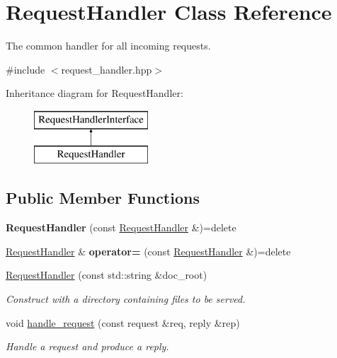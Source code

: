 \hypertarget{class_request_handler}{}\section{Request\+Handler Class Reference}
\label{class_request_handler}


The common handler for all incoming requests.  




{\ttfamily \#include $<$request\+\_\+handler.\+hpp$>$}

Inheritance diagram for Request\+Handler\+:\begin{figure}[H]
\begin{center}
\leavevmode
\includegraphics[height=2.000000cm]{class_request_handler}
\end{center}
\end{figure}
\subsection*{Public Member Functions}
\begin{DoxyCompactItemize}
\item 
\mbox{\label{class_request_handler_a7dc4f72ed63d826b58e8d5702a552287}} 
{\bfseries Request\+Handler} (const \hyperlink{class_request_handler}{Request\+Handler} \&)=delete
\item 
\mbox{\label{class_request_handler_a72a2ff62932e8ac74a5fe55415eff602}} 
\hyperlink{class_request_handler}{Request\+Handler} \& {\bfseries operator=} (const \hyperlink{class_request_handler}{Request\+Handler} \&)=delete
\item 
\mbox{\label{class_request_handler_ad8326a61b01339812eb11f2905f2407c}} 
\hyperlink{class_request_handler_ad8326a61b01339812eb11f2905f2407c}{Request\+Handler} (const std\+::string \&doc\+\_\+root)
\begin{DoxyCompactList}\small\item\em Construct with a directory containing files to be served. \end{DoxyCompactList}\item 
\mbox{\label{class_request_handler_ae7870b58bbff92ebab452e715a1f0121}} 
void \hyperlink{class_request_handler_ae7870b58bbff92ebab452e715a1f0121}{handle\+\_\+request} (const request \&req, reply \&rep)
\begin{DoxyCompactList}\small\item\em Handle a request and produce a reply. \end{DoxyCompactList}\end{DoxyCompactItemize}


